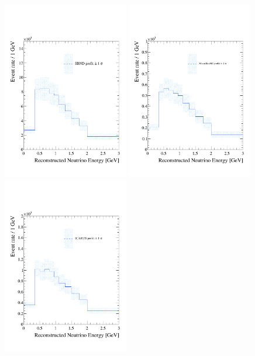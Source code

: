 \begin{figure}[h!]
  {\includegraphics[width=0.49\textwidth]{figures-chap6/spectra/envelopes/sbnd_1sigma_prefit.pdf}}
  {\includegraphics[width=0.49\textwidth]{figures-chap6/spectra/envelopes/uboone_1sigma_prefit.pdf}}
  {\includegraphics[width=0.49\textwidth]{figures-chap6/spectra/envelopes/icarus_1sigma_prefit.pdf}}

\end{figure}
